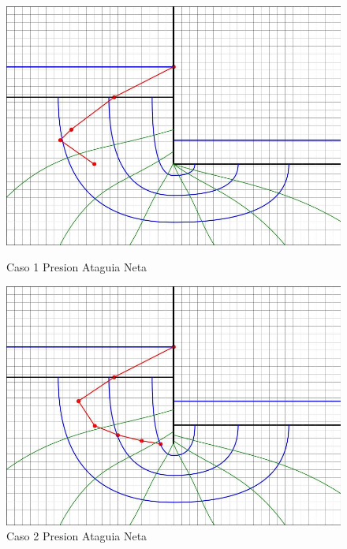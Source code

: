 \begin{figure}[H]
    \centering
    \begin{minipage}{0.32\textwidth}
        \centering
        \includegraphics[width=\textwidth]{GRAFICOS/caso_1_presion_ataguia_neta.jpg}
        \caption{Caso 1 Presion Ataguia Neta}
    \end{minipage}
    \begin{minipage}{0.32\textwidth}
        \centering
        \includegraphics[width=\textwidth]{GRAFICOS/caso_2_presion_ataguia_neta.jpg}
        \caption{Caso 2 Presion Ataguia Neta}
    \end{minipage}
    \begin{minipage}{0.32\textwidth}
        \centering

\end{minipage}
\end{figure}
